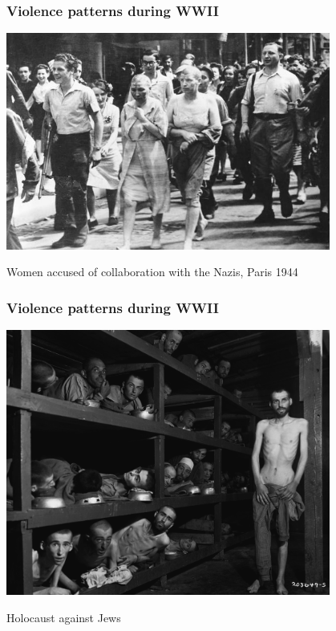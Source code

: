 \documentclass[utf8, xcolor=dvipsnames, handout]{beamer}
\begin{document}
\begin{frame}
\frametitle{Violence patterns during WWII}
\centering

\includegraphics[width = 0.8\textwidth]{img/wwii-womencolab}

Women accused of collaboration with the Nazis, Paris 1944

\end{frame}

\begin{frame}
\frametitle{Violence patterns during WWII}
\centering

\includegraphics[width = 0.8\textwidth]{img/wwii-holocaust}

Holocaust against Jews

\end{frame}
\end{document}
